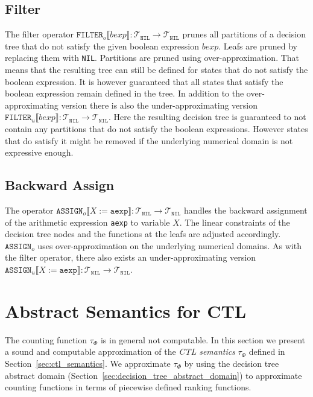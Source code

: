 \documentclass[11pt,a4paper,titlepage]{article}
\theoremstyle{definition}
\begin{document}
\subsection{Filter}\label{sec:tree_filter}
The filter operator $\mathtt{FILTER}_o\llbracket bexp \rrbracket \colon \mathcal{T}_\mathtt{NIL} \rightarrow \mathcal{T}_\mathtt{NIL}$
prunes all partitions of a decision tree that do not satisfy the given boolean expression $bexp$. Leafs are pruned by replacing them with \texttt{NIL}.
Partitions are pruned using over-approximation.
That means that the resulting tree can still be defined for states that do not satisfy the boolean expression. It is however guaranteed that all states 
that satisfy the boolean expression remain defined in the tree. In addition to the over-approximating version there is also the under-approximating version
$\mathtt{FILTER}_u \llbracket bexp \rrbracket \colon \mathcal{T}_\mathtt{NIL} \rightarrow \mathcal{T}_\mathtt{NIL}$. Here the resulting decision
tree is guaranteed to not contain any partitions that do not satisfy the boolean expressions. However states that do satisfy it might be removed if
the underlying numerical domain is not expressive enough.

\subsection{Backward Assign}\label{sec:tree_bwd_assign}
The operator $\mathtt{ASSIGN}_o \llbracket X := \mathtt{aexp} \rrbracket \colon \mathcal{T}_\mathtt{NIL} \rightarrow \mathcal{T}_\mathtt{NIL}$ handles
the backward assignment of the arithmetic expression \texttt{aexp} to variable $X$. The linear constraints of the decision tree nodes and the 
functions at the leafs are adjusted accordingly. $\mathtt{ASSIGN}_o$ uses over-approximation on the underlying numerical domains. 
As with the filter operator, there also exists an under-approximating version 
$\mathtt{ASSIGN}_u \llbracket X := \mathtt{aexp} \rrbracket \colon \mathcal{T}_\mathtt{NIL} \rightarrow \mathcal{T}_\mathtt{NIL}$.


\section{Abstract Semantics for CTL}\label{sec:abstract_ctl_semantics}

The counting function $\tau_\Phi$ is in general not computable. 
In this section we present a sound and computable approximation of the \textit{CTL semantics} $\tau_\Phi$ defined in Section~\ref{sec:ctl_semantics}.
We approximate $\tau_\Phi$ by using the decision tree abstract domain (Section~\ref{sec:decision_tree_abstract_domain}) 
to approximate counting functions in terms of piecewise defined ranking functions.
\end{document}
